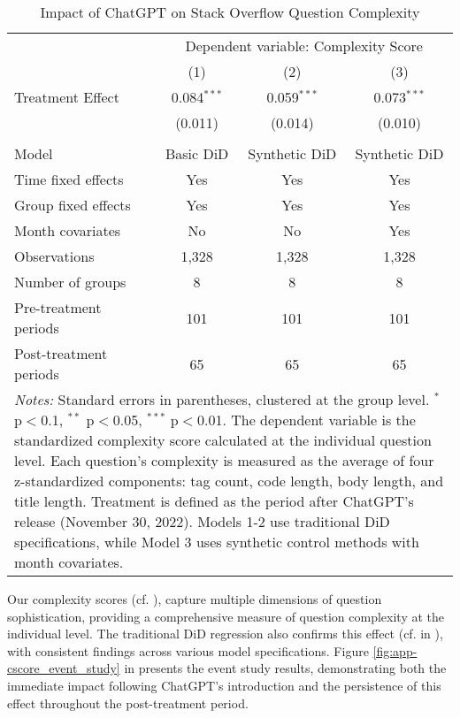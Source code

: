 \begin{table}[H]
    \centering
    \caption{Impact of ChatGPT on Stack Overflow Question Complexity}
    \label{tab:csscore_did_results}
    \begin{tabular}{lccc}
    \toprule
    & \multicolumn{3}{c}{Dependent variable: Complexity Score} \\
    \cmidrule(lr){2-4}
    & (1) & (2) & (3) \\
    \midrule
    Treatment Effect         & 0.084$^{***}$ & 0.059$^{***}$ & 0.073$^{***}$ \\
    & (0.011)       & (0.014)       & (0.010) \\
    &               &               & \\
    \midrule
    Model                    & Basic DiD     & Synthetic DiD & Synthetic DiD \\
    Time fixed effects       & Yes           & Yes           & Yes \\
    Group fixed effects      & Yes           & Yes           & Yes \\
    Month covariates         & No            & No            & Yes \\
    \midrule
    Observations             & 1,328         & 1,328         & 1,328 \\
    Number of groups         & 8             & 8             & 8 \\
    Pre-treatment periods    & 101           & 101           & 101 \\
    Post-treatment periods   & 65            & 65            & 65 \\
    \bottomrule
    \multicolumn{4}{p{1\linewidth}}{\footnotesize \textit{Notes:} Standard errors in parentheses, clustered at the group level. $^{*}$ p$<$0.1, $^{**}$ p$<$0.05, $^{***}$ p$<$0.01. The dependent variable is the standardized complexity score calculated at the individual question level. Each question's complexity is measured as the average of four z-standardized components: tag count, code length, body length, and title length. Treatment is defined as the period after ChatGPT's release (November 30, 2022). Models 1-2 use traditional DiD specifications, while Model 3 uses synthetic control methods with month covariates.} \\
    \end{tabular}
\end{table}

Our complexity scores (cf. ), capture multiple dimensions of question sophistication, providing a comprehensive measure of question complexity at the individual level. The traditional DiD regression also confirms this effect (cf.  in ), with consistent findings across various model specifications. Figure \ref{fig:app-cscore_event_study} in  presents the event study results, demonstrating both the immediate impact following ChatGPT's introduction and the persistence of this effect throughout the post-treatment period.\\

